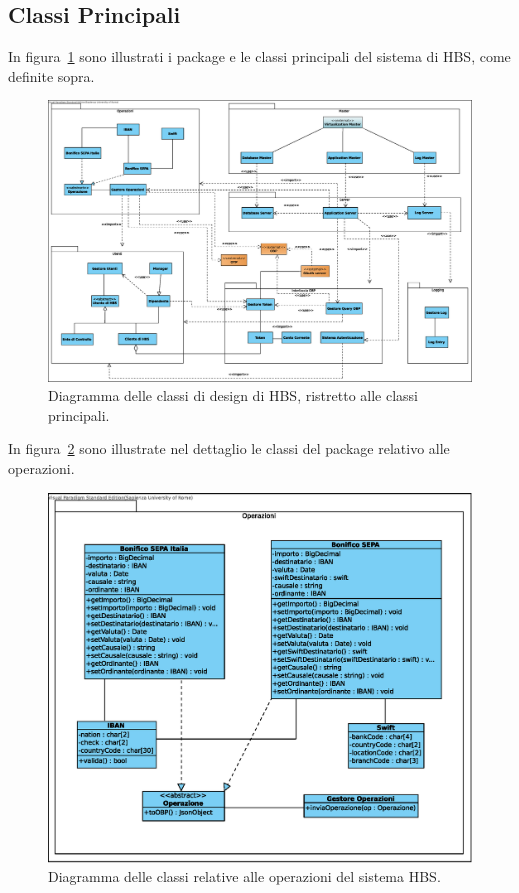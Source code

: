 
\subsection{Classi Principali}

In figura~\ref{fig:classi-principali} sono illustrati i package e le classi principali del sistema di HBS, come definite sopra.

\begin{figure}[h]
    \centering
    \includegraphics[width=\textheight, angle=90]{Images/Classi_Design.eps}
    \caption{Diagramma delle classi di design di HBS, ristretto alle classi principali.}
    \label{fig:classi-principali}
\end{figure}

In figura~\ref{fig:classi-principali:operazioni} sono illustrate nel dettaglio le classi del package relativo alle operazioni.

\begin{figure}[h]
    \centering
    \includegraphics[width=\textwidth]{Images/Operazioni_Design.eps}
    \caption{Diagramma delle classi relative alle operazioni del sistema HBS.}
    \label{fig:classi-principali:operazioni}
\end{figure}





